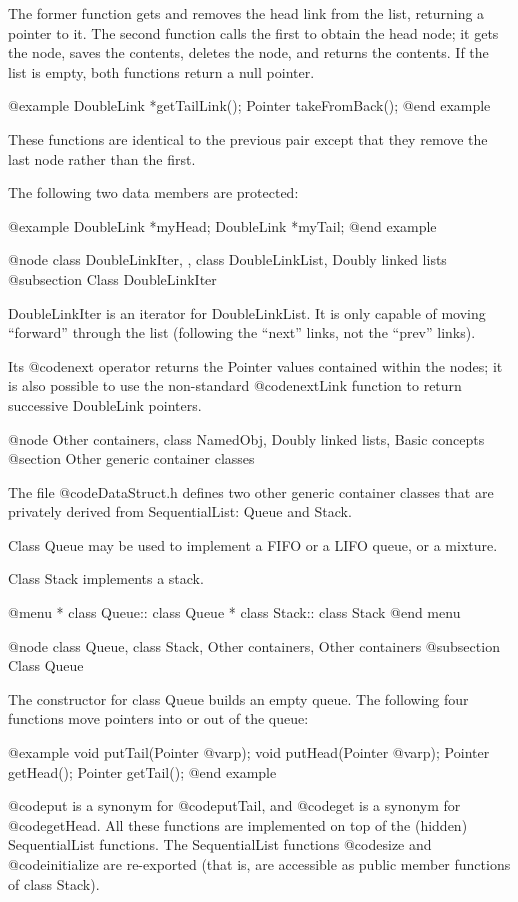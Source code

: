 The former function gets and removes the head link from the list,
returning a pointer to it.  The second function calls the first
to obtain the head node; it gets the node, saves the contents,
deletes the node, and returns the contents.  If the list is empty,
both functions return a null pointer.

@example
DoubleLink *getTailLink();
Pointer takeFromBack();
@end example

These functions are identical to the previous pair except that
they remove the last node rather than the first.

The following two data members are protected:

@example
DoubleLink *myHead;
DoubleLink *myTail;
@end example

@node class DoubleLinkIter,  , class DoubleLinkList, Doubly linked lists
@subsection Class DoubleLinkIter

DoubleLinkIter is an iterator for DoubleLinkList.  It is only capable
of moving ``forward'' through the list (following the ``next'' links,
not the ``prev'' links).

Its @code{next} operator returns the Pointer values contained within
the nodes; it is also possible to use the non-standard @code{nextLink}
function to return successive DoubleLink pointers.

@node Other containers, class NamedObj, Doubly linked lists, Basic concepts
@section Other generic container classes

The file @code{DataStruct.h} defines two other generic container classes
that are privately derived from SequentialList: Queue and Stack.

Class Queue may be used to implement a FIFO or a LIFO queue, or a
mixture.

Class Stack implements a stack.

@menu
* class Queue::                 class Queue
* class Stack::                 class Stack
@end menu

@node class Queue, class Stack, Other containers, Other containers
@subsection Class Queue

The constructor for class Queue builds an empty queue.  The following
four functions move pointers into or out of the queue:

@example
void putTail(Pointer @var{p});
void putHead(Pointer @var{p});
Pointer getHead();
Pointer getTail();
@end example

@code{put} is a synonym for @code{putTail}, and @code{get} is a synonym
for @code{getHead}.  All these functions are implemented on top of the
(hidden) SequentialList functions.  The SequentialList functions
@code{size} and @code{initialize} are re-exported (that is, are
accessible as public member functions of class Stack).

